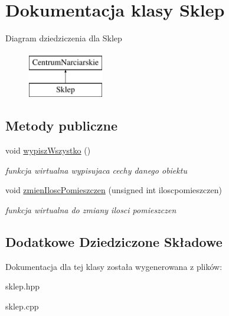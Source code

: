 \hypertarget{class_sklep}{}\section{Dokumentacja klasy Sklep}
\label{class_sklep}
Diagram dziedziczenia dla Sklep\begin{figure}[H]
\begin{center}
\leavevmode
\includegraphics[height=2.000000cm]{class_sklep}
\end{center}
\end{figure}
\subsection*{Metody publiczne}
\begin{DoxyCompactItemize}
\item 
\mbox{\label{class_sklep_a13a92e8796513fb8dcfaad878b55bb65}} 
void \hyperlink{class_sklep_a13a92e8796513fb8dcfaad878b55bb65}{wypisz\+Wszystko} ()
\begin{DoxyCompactList}\small\item\em funkcja wirtualna wypisujaca cechy danego obiektu \end{DoxyCompactList}\item 
\mbox{\label{class_sklep_a2a21b324f47f33722d0d3ce96c6e2084}} 
void \hyperlink{class_sklep_a2a21b324f47f33722d0d3ce96c6e2084}{zmien\+Ilosc\+Pomieszczen} (unsigned int iloscpomieszczen)
\begin{DoxyCompactList}\small\item\em funkcja wirtualna do zmiany ilosci pomieszczen \end{DoxyCompactList}\end{DoxyCompactItemize}
\subsection*{Dodatkowe Dziedziczone Składowe}


Dokumentacja dla tej klasy została wygenerowana z plików\+:\begin{DoxyCompactItemize}
\item 
sklep.\+hpp\item 
sklep.\+cpp\end{DoxyCompactItemize}
